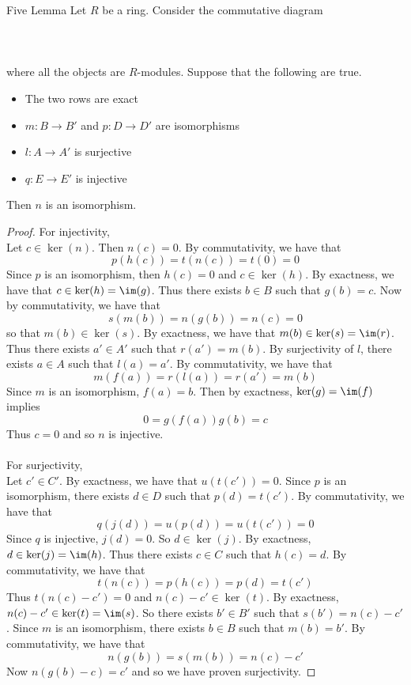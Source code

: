 \documentclass[a4paper]{article}
\begin{document}
\begin{lmm}{Five Lemma}{} Let $R$ be a ring. Consider the commutative diagram \\~\\
\\~\\
where all the objects are $R$-modules. Suppose that the following are true. 
\begin{itemize}
\item The two rows are exact
\item $m:B\to B'$ and $p:D\to D'$ are isomorphisms
\item $l:A\to A'$ is surjective
\item $q:E\to E'$ is injective
\end{itemize}
Then $n$ is an isomorphism. \tcbline
\begin{proof}
For injectivity, \\
Let $c\in\ker(n)$. Then $n(c)=0$. By commutativity, we have that $$p(h(c))=t(n(c))=t(0)=0$$ Since $p$ is an isomorphism, then $h(c)=0$ and $c\in\ker(h)$. By exactness, we have that $c\in\ker(h)=\im(g)$. Thus there exists $b\in B$ such that $g(b)=c$. Now by commutativity, we have that $$s(m(b))=n(g(b))=n(c)=0$$ so that $m(b)\in\ker(s)$. By exactness, we have that $m(b)\in\ker(s)=\im(r)$. Thus there exists $a'\in A'$ such that $r(a')=m(b)$. By surjectivity of $l$, there exists $a\in A$ such that $l(a)=a'$. By commutativity, we have that $$m(f(a))=r(l(a))=r(a')=m(b)$$ Since $m$ is an isomorphism, $f(a)=b$. Then by exactness, $\ker(g)=\im(f)$ implies $$0=g(f(a))g(b)=c$$ Thus $c=0$ and so $n$ is injective. \\~\\

For surjectivity, \\
Let $c'\in C'$. By exactness, we have that $u(t(c'))=0$. Since $p$ is an isomorphism, there exists $d\in D$ such that $p(d)=t(c')$. By commutativity, we have that $$q(j(d))=u(p(d))=u(t(c'))=0$$ Since $q$ is injective, $j(d)=0$. So $d\in\ker(j)$. By exactness, $d\in\ker(j)=\im(h)$. Thus there exists $c\in C$ such that $h(c)=d$. By commutativity, we have that $$t(n(c))=p(h(c))=p(d)=t(c')$$ Thus $t(n(c)-c')=0$ and $n(c)-c'\in\ker(t)$. By exactness, $n(c)-c'\in\ker(t)=\im(s)$. So there exists $b'\in B'$ such that $s(b')=n(c)-c'$. Since $m$ is an isomorphism, there exists $b\in B$ such that $m(b)=b'$. By commutativity, we have that $$n(g(b))=s(m(b))=n(c)-c'$$ Now $n(g(b)-c)=c'$ and so we have proven surjectivity. 
\end{proof}
\end{lmm}
\end{document}
